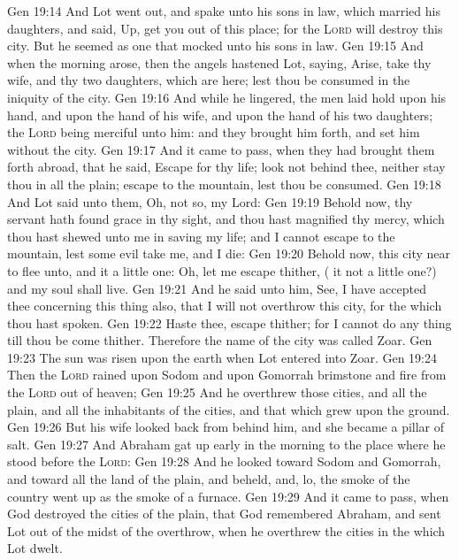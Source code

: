 \vs Gen 19:14 And Lot went out, and spake unto his sons in law, which married his daughters, and said, Up, get you out of this place; for the \textsc{Lord} will destroy this city. But he seemed as one that mocked unto his sons in law.
\vs Gen 19:15 And when the morning arose, then the angels hastened Lot, saying, Arise, take thy wife, and thy two daughters, which are here; lest thou be consumed in the iniquity of the city.
\vs Gen 19:16 And while he lingered, the men laid hold upon his hand, and upon the hand of his wife, and upon the hand of his two daughters; the \textsc{Lord} being merciful unto him: and they brought him forth, and set him without the city.
\vs Gen 19:17 And it came to pass, when they had brought them forth abroad, that he said, Escape for thy life; look not behind thee, neither stay thou in all the plain; escape to the mountain, lest thou be consumed.
\vs Gen 19:18 And Lot said unto them, Oh, not so, my Lord:
\vs Gen 19:19 Behold now, thy servant hath found grace in thy sight, and thou hast magnified thy mercy, which thou hast shewed unto me in saving my life; and I cannot escape to the mountain, lest some evil take me, and I die:
\vs Gen 19:20 Behold now, this city  near to flee unto, and it  a little one: Oh, let me escape thither, ( it not a little one?) and my soul shall live.
\vs Gen 19:21 And he said unto him, See, I have accepted thee concerning this thing also, that I will not overthrow this city, for the which thou hast spoken.
\vs Gen 19:22 Haste thee, escape thither; for I cannot do any thing till thou be come thither. Therefore the name of the city was called Zoar.
\vs Gen 19:23 The sun was risen upon the earth when Lot entered into Zoar.
\vs Gen 19:24 Then the \textsc{Lord} rained upon Sodom and upon Gomorrah brimstone and fire from the \textsc{Lord} out of heaven;
\vs Gen 19:25 And he overthrew those cities, and all the plain, and all the inhabitants of the cities, and that which grew upon the ground.
\vs Gen 19:26 But his wife looked back from behind him, and she became a pillar of salt.
\vs Gen 19:27 And Abraham gat up early in the morning to the place where he stood before the \textsc{Lord}:
\vs Gen 19:28 And he looked toward Sodom and Gomorrah, and toward all the land of the plain, and beheld, and, lo, the smoke of the country went up as the smoke of a furnace.
\vs Gen 19:29 And it came to pass, when God destroyed the cities of the plain, that God remembered Abraham, and sent Lot out of the midst of the overthrow, when he overthrew the cities in the which Lot dwelt.
